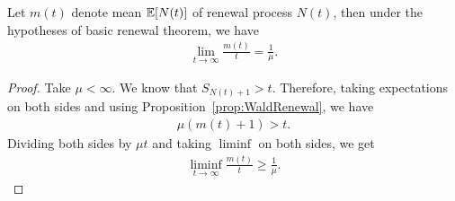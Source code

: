 \documentclass[a4paper,10pt, english]{article}
\begin{document}
\begin{thm} Let $m(t)$ denote mean $\mathbb{E}[N(t)]$ of renewal process $N(t)$, then under the hypotheses of basic renewal theorem, we have 
	\begin{align*}
	\lim_{t \to \infty}\frac{m(t)}{t} = \frac{1}{\mu}.
	\end{align*}
\end{thm}
\begin{proof}
	Take $\mu < \infty$. We know that $S_{N(t)+1} > t$. Therefore, taking expectations on both sides and using Proposition~\ref{prop:WaldRenewal}, we have 
	\begin{align*}
	\mu (m(t) + 1) > t.
	\end{align*}
	Dividing both sides by $\mu t$ and taking $\liminf$ on both sides, we get
	\begin{align}
	\label{eq:LiminfMean}
	\liminf_{t \to \infty} \frac{m(t)}{t} \geq \frac{1}{\mu}.
	\end{align}
	

\end{proof}
\end{document}
